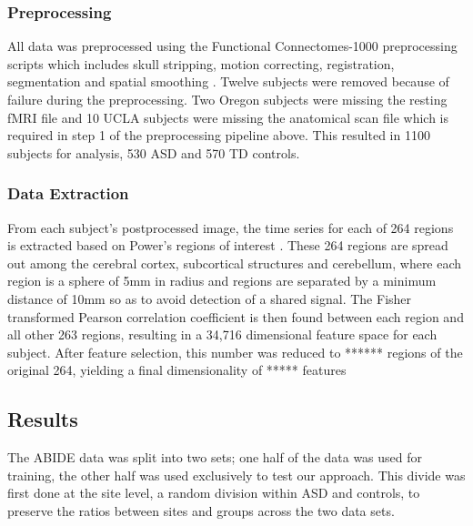\documentclass{llncs}
\begin{document}
\subsubsection{Preprocessing}
All data was preprocessed using the Functional Connectomes-1000 preprocessing scripts which includes skull stripping, motion correcting, registration, segmentation and spatial smoothing \cite{fcon}.
Twelve subjects were removed because of failure during the preprocessing.  Two Oregon subjects were missing the resting fMRI file and 10 UCLA subjects were missing the anatomical scan file which is required in step 1 of the preprocessing pipeline above. This resulted in 1100 subjects for analysis, 530 ASD and 570 TD controls.
\subsubsection{Data Extraction}
From each subject's postprocessed image, the time series for each of 264 regions is extracted based on Power's regions of interest \cite{Powers}. These 264 regions are spread out among the cerebral cortex, subcortical structures and cerebellum, where each region is a sphere of 5mm in radius and regions are separated by a minimum distance of 10mm so as to avoid detection of a shared signal. The Fisher transformed Pearson correlation coefficient is then found between each region and all other 263 regions, resulting in a 34,716 dimensional feature space for each subject. After feature selection, this number was reduced to ****** regions of the original 264, yielding a final dimensionality of ***** features
\subsection{Results}
The ABIDE data was split into two sets; one half of the data was used for training, the other half was used exclusively to test our approach.  This divide was first done at the site level, a random division within ASD and controls, to preserve the ratios between sites and groups across the two data sets.
\end{document}
